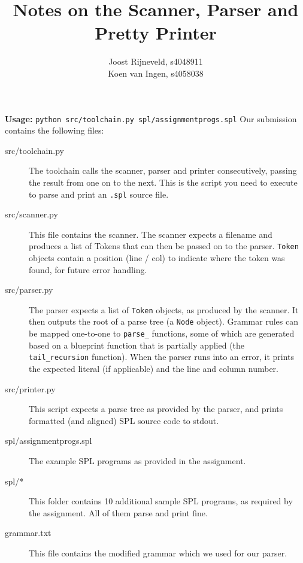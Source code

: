\documentclass[a4paper]{article}
\title{Notes on the Scanner, Parser and Pretty Printer}
\author{Joost Rijneveld, s4048911\\Koen van Ingen, s4058038}
\date{}
\begin{document}
\maketitle

{\bf Usage:} {\tt python src/toolchain.py spl/assignmentprogs.spl}
Our submission contains the following files:

\begin{description}
	\item[src/toolchain.py] The toolchain calls the scanner, parser and printer consecutively, passing the result from one on to the next. This is the script you need to execute to parse and print an {\tt .spl} source file.
	\item[src/scanner.py] This file contains the scanner. The scanner expects a filename and produces a list of Tokens that can then be passed on to the parser. {\tt Token} objects contain a position (line / col) to indicate where the token was found, for future error handling.
	\item[src/parser.py] The parser expects a list of {\tt Token} objects, as produced by the scanner. It then outputs the root of a parse tree (a {\tt Node} object). Grammar rules can be mapped one-to-one to {\tt parse\_} functions, some of which are generated based on a blueprint function that is partially applied (the {\tt tail\_recursion} function). When the parser runs into an error, it prints the expected literal (if applicable) and the line and column number.
	\item[src/printer.py] This script expects a parse tree as provided by the parser, and prints formatted (and aligned) SPL source code to stdout.
	\item[spl/assignmentprogs.spl] The example SPL programs as provided in the assignment.
	\item[spl/*] This folder contains 10 additional sample SPL programs, as required by the assignment. All of them parse and print fine.
	\item[grammar.txt] This file contains the modified grammar which we used for our parser.
\end{description}
\end{document}
